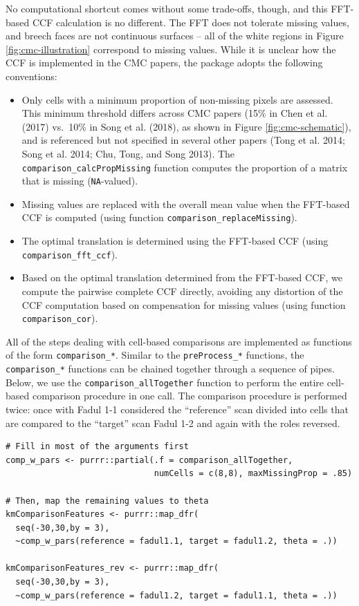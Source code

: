 No computational shortcut comes without some trade-offs, though, and this FFT-based CCF calculation is no different.
The FFT does not tolerate missing values, and breech faces are not continuous surfaces -- all of the white regions in Figure \ref{fig:cmc-illustration} correspond to missing values.
While it is unclear how the CCF is implemented in the CMC papers, the  package adopts the following conventions:

\begin{itemize}
\item
  Only cells with a minimum proportion of non-missing pixels are assessed. This minimum threshold differs across CMC papers (15\% in Chen et al. (2017) vs.~10\% in Song et al. (2018), as shown in Figure \ref{fig:cmc-schematic}), and is referenced but not specified in several other papers (Tong et al. 2014; Song et al. 2014; Chu, Tong, and Song 2013). The \texttt{comparison\_calcPropMissing} function computes the proportion of a matrix that is missing (\texttt{NA}-valued).
\item
  Missing values are replaced with the overall mean value when the FFT-based CCF is computed (using function \texttt{comparison\_replaceMissing}).
\item
  The optimal translation is determined using the FFT-based CCF (using \texttt{comparison\_fft\_ccf}).
\item
  Based on the optimal translation determined from the FFT-based CCF, we compute the pairwise complete CCF directly, avoiding any distortion of the CCF computation based on compensation for missing values (using function \texttt{comparison\_cor}).
\end{itemize}

All of the steps dealing with cell-based comparisons are implemented as functions of the form \texttt{comparison\_*}.
Similar to the \texttt{preProcess\_*} functions, the \texttt{comparison\_*} functions can be chained together through a sequence of pipes.
Below, we use the \texttt{comparison\_allTogether} function to perform the entire cell-based comparison procedure in one call.
The comparison procedure is performed twice: once with Fadul 1-1 considered the ``reference'' scan divided into cells that are compared to the ``target'' scan Fadul 1-2 and again with the roles reversed.

\begin{verbatim}
# Fill in most of the arguments first
comp_w_pars <- purrr::partial(.f = comparison_allTogether,
                              numCells = c(8,8), maxMissingProp = .85)

# Then, map the remaining values to theta
kmComparisonFeatures <- purrr::map_dfr(
  seq(-30,30,by = 3),
  ~comp_w_pars(reference = fadul1.1, target = fadul1.2, theta = .))

kmComparisonFeatures_rev <- purrr::map_dfr(
  seq(-30,30,by = 3),
  ~comp_w_pars(reference = fadul1.2, target = fadul1.1, theta = .))
\end{verbatim}

